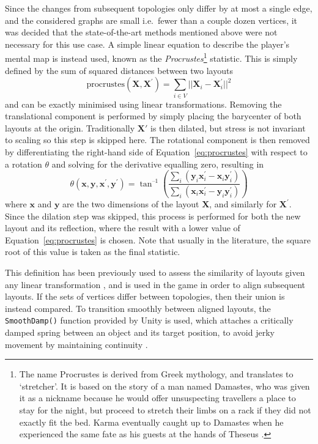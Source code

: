 Since the changes from subsequent topologies only differ by at most a single edge, and the considered graphs are small i.e.\ fewer than a couple dozen vertices, it was decided that the state-of-the-art methods mentioned above were not necessary for this use case. A simple linear equation to describe the player's mental map is instead used, known as the \emph{Procrustes}\footnote{The name Procrustes is derived from Greek mythology, and translates to `stretcher'. It is based on the story of a man named Damastes, who was given it as a nickname because he would offer unsuspecting travellers a place to stay for the night, but proceed to stretch their limbs on a rack if they did not exactly fit the bed. Karma eventually caught up to Damastes when he experienced the same fate as his guests at the hands of Theseus \cite{Cox2000}.} statistic.
This is simply defined by the sum of squared distances between two layouts
\begin{equation}
  \mathrm{procrustes}(\mathbf{X}, \mathbf{X}^\prime) = \sum_{i\in V} ||\mathbf{X}_i - \mathbf{X}_i^\prime||^2
  \label{eq:procrustes}
\end{equation}
and can be exactly minimised using linear transformations.
Removing the translational component is performed by simply placing the barycenter of both layouts at the origin. Traditionally $\mathbf{X}'$ is then dilated, but stress is not invariant to scaling so this step is skipped here. The rotational component is then removed by differentiating the right-hand side of Equation~\eqref{eq:procrustes} with respect to a rotation $\theta$ and solving for the derivative equalling zero, resulting in
\begin{equation}
  \theta(\mathbf{x},\mathbf{y}, \mathbf{x^\prime}, \mathbf{y^\prime}) = 
  \tan^{\text{--}1}\left(\frac{\sum_i(\mathbf{y}_i\mathbf{x}^\prime_i-\mathbf{x}_i\mathbf{y}^\prime_i)}{\sum_i(\mathbf{x}_i\mathbf{x}^\prime_i-\mathbf{y}_i\mathbf{y}^\prime_i)}\right)
\end{equation}
where $\mathbf{x}$ and $\mathbf{y}$ are the two dimensions of the layout $\mathbf{X}$, and similarly for $\mathbf{X}^\prime$. Since the dilation step was skipped, this process is performed for both the new layout and its reflection, where the result with a lower value of Equation~\eqref{eq:procrustes} is chosen. Note that usually in the literature, the square root of this value is taken as the final statistic.

This definition has been previously used to assess the similarity of layouts given any linear transformation \cite{Ortmann2017}, and is used in the game in order to align subsequent layouts. If the sets of vertices differ between topologies, then their union is instead compared.
To transition smoothly between aligned layouts, the \texttt{SmoothDamp()} function provided by Unity is used, which attaches a critically damped spring between an object and its target position, to avoid jerky movement by maintaining continuity \cite{Kirmse2004}.

